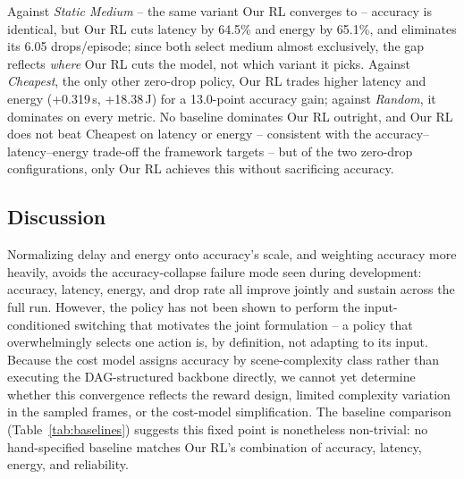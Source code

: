\documentclass[conference]{IEEEtran}
\begin{document}
Against \textit{Static Medium} -- the same variant Our RL converges to -- accuracy is identical, but Our RL cuts latency by 64.5\% and energy by 65.1\%, and eliminates its 6.05 drops/episode; since both select medium almost exclusively, the gap reflects \textit{where} Our RL cuts the model, not which variant it picks. Against \textit{Cheapest}, the only other zero-drop policy, Our RL trades higher latency and energy (+0.319\,s, +18.38\,J) for a 13.0-point accuracy gain; against \textit{Random}, it dominates on every metric. No baseline dominates Our RL outright, and Our RL does not beat Cheapest on latency or energy -- consistent with the accuracy--latency--energy trade-off the framework targets -- but of the two zero-drop configurations, only Our RL achieves this without sacrificing accuracy.

\subsection{Discussion}
Normalizing delay and energy onto accuracy's scale, and weighting accuracy more heavily, avoids the accuracy-collapse failure mode seen during development: accuracy, latency, energy, and drop rate all improve jointly and sustain across the full run. However, the policy has not been shown to perform the input-conditioned switching that motivates the joint formulation -- a policy that overwhelmingly selects one action is, by definition, not adapting to its input. Because the cost model assigns accuracy by scene-complexity class rather than executing the DAG-structured backbone directly, we cannot yet determine whether this convergence reflects the reward design, limited complexity variation in the sampled frames, or the cost-model simplification. The baseline comparison (Table~\ref{tab:baselines}) suggests this fixed point is nonetheless non-trivial: no hand-specified baseline matches Our RL's combination of accuracy, latency, energy, and reliability.

\end{document}
